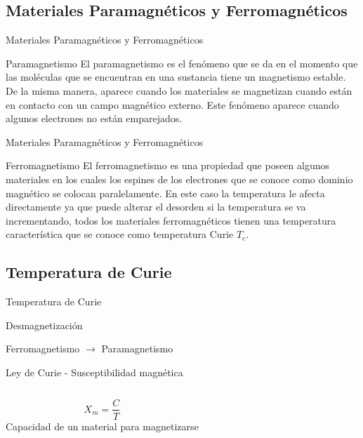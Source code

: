 \documentclass[10pt]{beamer}
\begin{document}
    \subsection{\textrm{Materiales Paramagnéticos y Ferromagnéticos}}
        \begin{frame}{\textrm{Materiales Paramagnéticos y Ferromagnéticos}}
            \begin{block}{Paramagnetismo}
                El paramagnetismo es el fenómeno que se da en el momento que las moléculas que se encuentran en una sustancia tiene un magnetismo estable. De la misma manera, aparece cuando los materiales se magnetizan cuando están en contacto con un campo magnético externo. Este fenómeno aparece cuando algunos electrones no están emparejados.
            \end{block}
        \end{frame}
        \begin{frame}{\textrm{Materiales Paramagnéticos y Ferromagnéticos}}
            \begin{block}{Ferromagnetismo}
                El ferromagnetismo es una propiedad que poseen algunos materiales en los cuales los espines de los electrones que se conoce como dominio magnético se colocan paralelamente. En este caso la temperatura le afecta directamente ya que puede alterar el desorden si la temperatura se va incrementando, todos los materiales ferromagnéticos tienen una temperatura característica que se conoce como temperatura Curie $T_c$.
            \end{block}
        \end{frame}



        
    \subsection{\textrm{Temperatura de Curie}}
    \begin{frame}{\textrm{Temperatura de Curie}} 
        \begin{block} {Desmagnetización}

        Ferromagnetismo  $\rightarrow$   Paramagnetismo

        \end{block}

        
        \begin{block} {Ley de Curie - Susceptibilidad magnética}


            \begin{columns}
                        \begin{equation*} 
                        X_m=\frac{C}{T}
                        \end{equation*}
            Capacidad de un material para magnetizarse
            \end{columns}
       
        \end{block}
        
       
    \end{frame}
\end{document}
